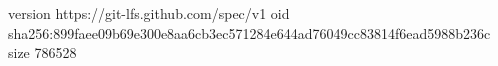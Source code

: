 version https://git-lfs.github.com/spec/v1
oid sha256:899faee09b69e300e8aa6cb3ec571284e644ad76049cc83814f6ead5988b236c
size 786528
